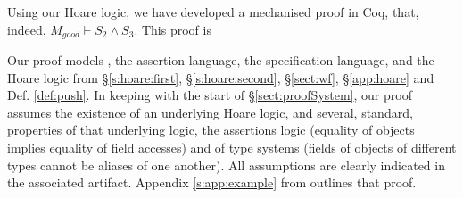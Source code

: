Using our Hoare logic, we have developed a mechanised proof in Coq, that, indeed, $M_{good} \vdash S_2 \wedge S_3$.
This proof is 

Our proof models  \LangOO, the assertion language, the specification language, and the Hoare logic from \S \ref{s:hoare:first},  \S   \ref{s:hoare:second},  \S  \ref{sect:wf},  \S \ref{app:hoare} and Def. \ref{def:push}.
In keeping with   the start of  \S \ref{sect:proofSystem}, our proof assumes the existence of an underlying Hoare logic,  
and several, standard, properties of that underlying logic, the assertions logic (\eg equality of objects implies equality of field accesses) and of type systems
(\eg  fields of objects of different types cannot be aliases of one another).
All assumptions  are clearly indicated in the associated artifact.
%
%
%
Appendix \ref{s:app:example} from \cite{externalCallsFull} %
outlines %
 that proof. 

